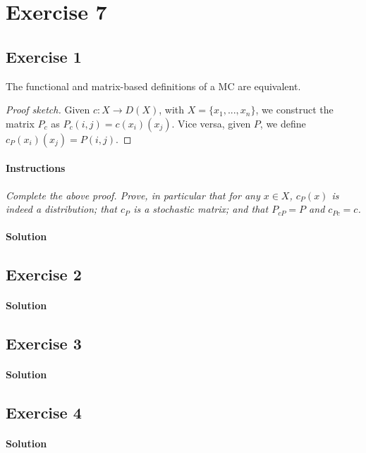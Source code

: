 \section*{Exercise 7}

\subsection*{Exercise 1}
\begin{proposition}
    The functional and matrix-based definitions of a MC are equivalent.
\end{proposition}

\begin{proof}[Proof sketch]
    Given $ c : X \to  D(X) $, with $ X = \{x_{1}, . . . , x_{n}\} $, we construct the 
    matrix $ P_{c} $ as $ P_{c}(i, j) = c(x_{i})(x_{j}) $. 
    Vice versa, given $ P $, we define $ c_{P}(x_{i})(x_{j}) = P(i, j) $.
\end{proof}

\paragraph{Instructions} \textit{Complete the above proof. Prove, in particular that for any $ x \in X $, $ c_{P} (x) $ is indeed a distribution; 
that $ c_{P} $ is a stochastic matrix; and that $ P_{cP} = P $ and $ c_{Pc} = c $.}

\paragraph{Solution}


\subsection*{Exercise 2}

\paragraph{Solution}


\subsection*{Exercise 3}

\paragraph{Solution}


\subsection*{Exercise 4}

\paragraph{Solution}